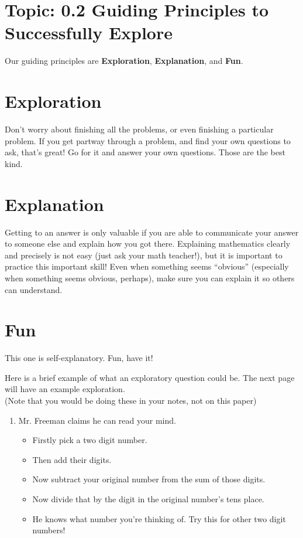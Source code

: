 \documentclass[12pt,letterpaper]{article}
\begin{document}
\section*{Topic: 0.2 Guiding Principles to Successfully Explore}
Our guiding principles are \textbf{Exploration}, \textbf{Explanation}, and \textbf{Fun}.

\section*{Exploration} Don’t worry about finishing all the problems, or even finishing a particular problem. If you get partway through a problem, and find your own questions to ask, that’s great! Go for it and answer your own questions. Those are the best kind.

\section*{Explanation} Getting to an answer is only valuable if you are able to communicate your answer to someone else and explain how you got there. Explaining mathematics clearly and precisely is not easy (just ask your math teacher!), but it is important to practice this important skill! Even when something seems “obvious” (especially when something seems obvious, perhaps), make sure you can explain it so others can understand.

\section*{Fun} This one is self-explanatory. Fun, have it!

Here is a brief example of what an exploratory question could be. The next page will have an example exploration.\\
(Note that you would be doing these in your notes, not on this paper)
\begin{enumerate}
    \item Mr. Freeman claims he can read your mind.
          \begin{itemize}
              \item Firstly pick a two digit number.
              \item Then add their digits.
              \item Now subtract your original number from the sum of those digits. \item Now divide that by the digit in the original number's tens place.
              \item He knows what number you're thinking of. Try this for other two digit numbers!
          \end{itemize}
\end{enumerate}
\end{document}
